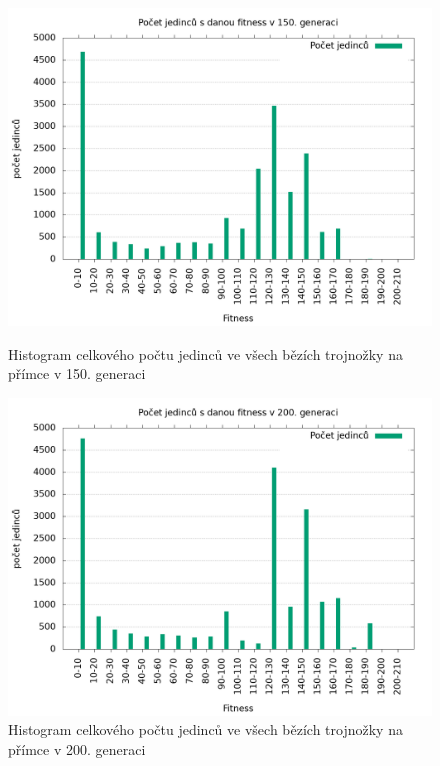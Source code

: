 \begin{figure}[h]
    \begin{minipage}[c]{0.48\linewidth}
        \includegraphics[width=\linewidth]{obrazky/trojnozka_primka_fitnessHistogram150.png}
        \caption{Histogram celkového počtu jedinců ve všech bězích trojnožky na přímce v 150. generaci}
    \end{minipage}
    \hfill
    \begin{minipage}[c]{0.48\linewidth}
        \includegraphics[width=\linewidth]{obrazky/trojnozka_primka_fitnessHistogram200.png}
        \caption{Histogram celkového počtu jedinců ve všech bězích trojnožky na přímce v 200. generaci}
    \end{minipage}
\end{figure}

